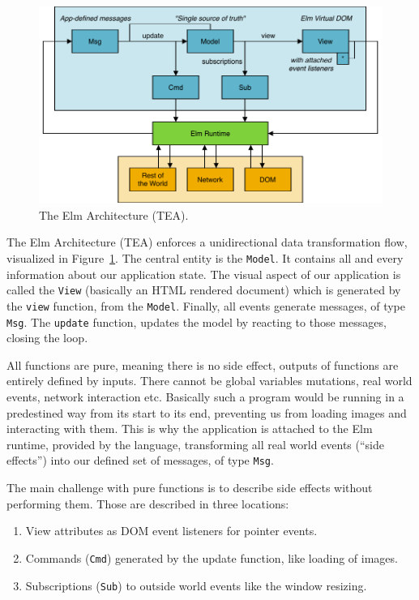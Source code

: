 \begin{figure}[ht]
\includegraphics[width=\columnwidth]{assets/img/tea-draw-io.pdf}
\caption{The Elm Architecture (TEA).}%
\label{fig:tea}
\end{figure}

The Elm Architecture (TEA) enforces a unidirectional data transformation flow,
visualized in Figure~\ref{fig:tea}.
The central entity is the \verb|Model|.
It contains all and every information about our application state.
The visual aspect of our application is called the \verb|View|
(basically an HTML rendered document) which is generated by the \verb|view| function,
from the \verb|Model|. Finally, all events generate messages, of type \verb|Msg|.
The \verb|update| function, updates the model by reacting to those messages, closing the loop.

All functions are pure, meaning there is no side effect,
outputs of functions are entirely defined by inputs.
There cannot be global variables mutations,
real world events, network interaction etc.
Basically such a program would be running in a predestined way
from its start to its end,
preventing us from loading images and interacting with them.
This is why the application is attached to the Elm runtime,
provided by the language, transforming all real world events (``side effects'')
into our defined set of messages, of type \verb|Msg|.

The main challenge with pure functions is
to describe side effects without performing them.
Those are described in three locations:

\begin{enumerate}
\item View attributes as DOM event listeners for pointer events.
\item Commands (\verb|Cmd|) generated by the update function, like loading of images.
\item Subscriptions (\verb|Sub|) to outside world events like the window resizing.
\end{enumerate}

